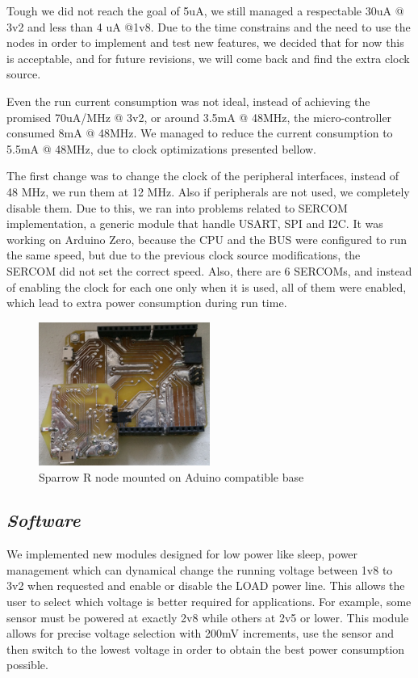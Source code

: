 Tough we did not reach the goal of 5uA, we still managed a respectable 30uA @ 3v2 and less than 4 uA @1v8.
Due to the time constrains and the need to use the nodes in order to implement and test new
features, we decided that for now this is acceptable, and for future revisions, we will come back
and find the extra clock source.

Even the run current consumption was not ideal, instead of achieving the promised 70uA/MHz @ 3v2,
or around 3.5mA @ 48MHz, the micro-controller consumed 8mA @ 48MHz. We managed to reduce the current consumption to 5.5mA @ 48MHz, due to
clock optimizations presented bellow.

The first change was to change the clock of the peripheral interfaces, instead of 48 MHz, we run them at 12 MHz.
Also if peripherals are not used, we completely disable them. Due to this, we ran into problems
related to SERCOM implementation, a generic module that handle USART, SPI and I2C. It was working
on Arduino Zero, because the CPU and the BUS were configured to run the same speed, but due to the
previous clock source modifications, the SERCOM did not set the correct speed. Also, there are 6
SERCOMs, and instead of enabling the clock for each one only when it is used, all of them were
enabled, which lead to extra power consumption during run time.

\begin{figure}[ht] \centering
\includegraphics[width=0.5\textwidth]{img/base-with-sensor.jpg}
\caption{Sparrow R node mounted on Aduino compatible base}
\end{figure}
\subsection{\textit{Software}}


We implemented new modules designed for low power like sleep, power management which can dynamical
change the running voltage between 1v8 to 3v2 when requested and enable or disable the LOAD power
line. This allows the user to select which voltage is better required for applications. For example,
some sensor must be powered at exactly 2v8 while others at 2v5 or lower. This module allows for
precise voltage selection with 200mV increments, use the sensor and then switch to the lowest
voltage in order to obtain the best power consumption possible.

